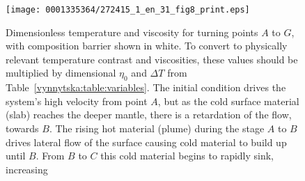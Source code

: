 \begin{figure}[!t]
  \centering
\texttt{[image: 0001335364/272415\_1\_en\_31\_fig8\_print.eps]}
  \caption{Dimensionless temperature and viscosity for turning points
    $A$ to $G$, with composition barrier shown in white. To convert to
    physically relevant temperature contrast and viscosities, these
    values should be multiplied by dimensional $\eta_0$ and $\Delta T$
    from Table~\ref{vynnytska:table:variables}. The initial condition
    drives the system's high velocity from point $A$, but as the cold
    surface material (slab) reaches the deeper mantle, there is a
    retardation of the flow, towards $B$. The rising hot material
    (plume) during the stage $A$ to $B$ drives lateral flow of the
    surface causing cold material to build up until $B$. From $B$ to
    $C$ this cold material begins to rapidly sink, increasing
}
\end{figure}
